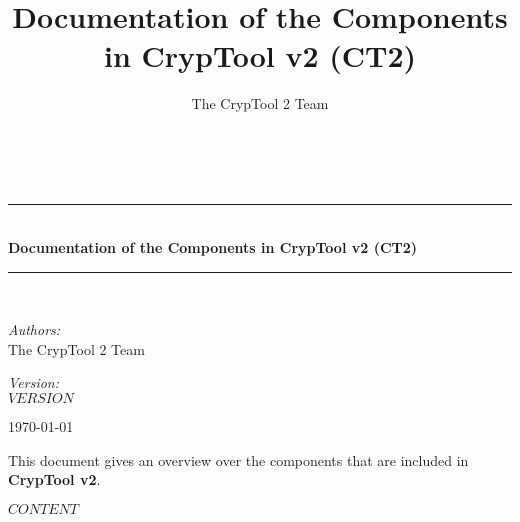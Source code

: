 \documentclass[10pt,a4paper]{scrreprt}
\title{Documentation of the Components in CrypTool v2 (CT2)}
\author{The CrypTool 2 Team}
\newcommand{\HRule}{\rule{\linewidth}{0.5mm}}
\begin{document}
\begin{titlepage}
\begin{center}
\hspace{0pt}\\[2.5cm]

\HRule \\[0.4cm]
{ \huge \bfseries Documentation of the Components in CrypTool v2 (CT2) }\\[0.4cm]
\HRule \\[1.5cm]

\begin{minipage}{0.4\textwidth}
\begin{flushleft} \large
\emph{Authors:} \\
The CrypTool 2 Team
\end{flushleft}
\end{minipage}
\begin{minipage}{0.4\textwidth}
\begin{flushright} \large
\emph{Version:} \\
$VERSION$
\end{flushright}
\end{minipage}
\vfill
{\large \today}
\end{center}
\newpage
\large
This document gives an overview over the components that are included in {\bf CrypTool v2}.
\newpage
\end{titlepage}

\tableofcontents
\newpage

$CONTENT$
\end{document}
